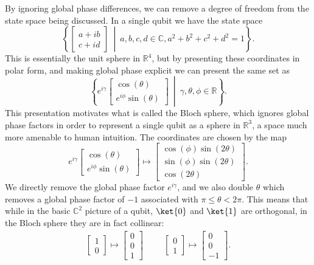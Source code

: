 By ignoring global phase differences, we can remove a degree of freedom from the state space being discussed. In a single qubit we have the state space
\[\left\{\begin{bmatrix}a+ib \\ c+id\end{bmatrix}\ \middle|\ a, b, c, d \in \mathbb{C}, a^2+b^2+c^2+d^2 = 1\right\}.\]
This is essentially the unit sphere in $\mathbb{R}^4$, but by presenting these coordinates in polar form, and making global phase explicit we can present the same set as
\[\left\{e^{i\gamma}\begin{bmatrix}\cos(\theta) \\ e^{i\phi}\sin(\theta)\end{bmatrix}\ \middle|\ \gamma, \theta, \phi \in \mathbb{R}\right\}.\]
This presentation motivates what is called the Bloch sphere, which ignores global phase factors in order to represent a single qubit as a sphere in $\mathbb{R}^3$, a space much more amenable to human intuition. The coordinates are chosen by the map
\[e^{i\gamma}\begin{bmatrix}\cos(\theta) \\ e^{i\phi}\sin(\theta)\end{bmatrix} \mapsto
\begin{bmatrix}\cos(\phi)\sin(2\theta) \\ \sin(\phi)\sin(2\theta) \\ \cos(2\theta)\end{bmatrix}.\]
We directly remove the global phase factor $e^{i\gamma}$, and we also double $\theta$ which removes a global phase factor of $-1$ associated with $\pi \leq \theta < 2\pi$. This means that while in the basic $\mathbb{C}^2$ picture of a qubit, $\ket{0}$ and $\ket{1}$ are orthogonal, in the Bloch sphere they are in fact collinear:
\begin{align*}
\begin{bmatrix}1 \\ 0\end{bmatrix} \mapsto \begin{bmatrix}0\\0\\1\end{bmatrix}
&&&
\begin{bmatrix}0 \\ 1\end{bmatrix} \mapsto \begin{bmatrix}0\\0\\-1\end{bmatrix}.
\end{align*}
